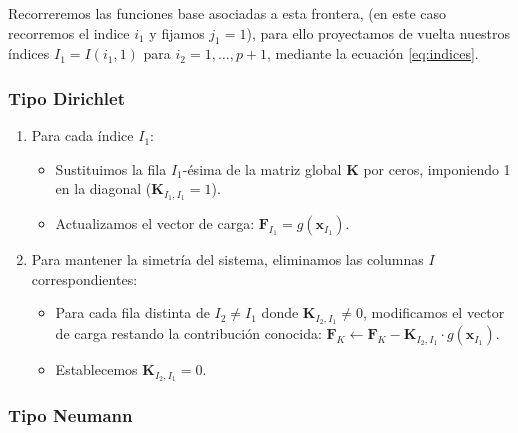 \documentclass[11pt]{book}
\theoremstyle{plain} %
\theoremstyle{definition} %
\theoremstyle{definition} %
\begin{document}
Recorreremos las funciones base asociadas a esta frontera, (en este caso recorremos el indice $i_1$ y fijamos $j_1=1$), para ello proyectamos de vuelta nuestros índices $I_{1}=I(i_1,1)$ para $i_2=1,\dots,p+1$, mediante la ecuación \ref{eq:indices}.

\vspace{-0.5cm}

\subsubsection{Tipo Dirichlet}
\begin{enumerate}
    \item Para cada índice $I_{1}$:
    
    \vspace{-0.3cm}

    \begin{itemize}
        \item Sustituimos la fila $I_{1}$-ésima de la matriz global $\mathbf{K}$ por ceros, imponiendo 1 en la diagonal ($\mathbf{K}_{I_1,I_1} = 1$).
        \item Actualizamos el vector de carga: $\mathbf{F}_{I_{1}} = g(\mathbf{x}_{I_{1}})$.
    \end{itemize}
    \item Para mantener la simetría del sistema, eliminamos las columnas $I$ correspondientes:

    \vspace{-0.3cm}

    \begin{itemize}
        \item Para cada fila distinta de $I_2 \neq I_1$ donde $\mathbf{K}_{I_2,I_1} \neq 0$, modificamos el vector de carga restando la contribución conocida: $\mathbf{F}_K \leftarrow \mathbf{F}_K - \mathbf{K}_{I_2,I_1} \cdot g(\mathbf{x}_{I_1})$.
        \item Establecemos $\mathbf{K}_{I_2,I_1} = 0$.
    \end{itemize}

\end{enumerate}

\vspace{-0.9cm}


\subsubsection{Tipo Neumann}

\vspace{-0.2cm}
\end{document}
